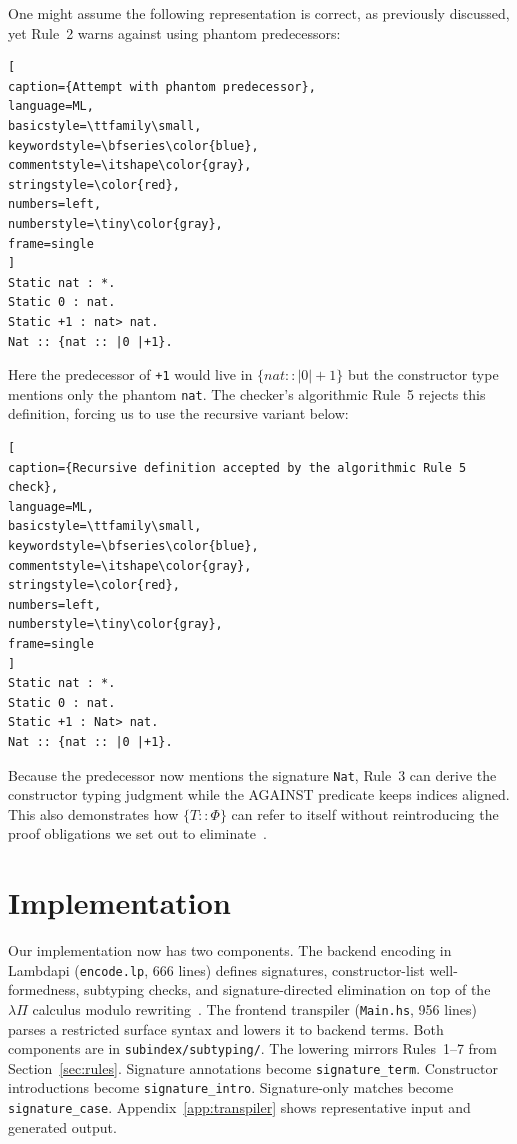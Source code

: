 \documentclass[a4paper, anonymous, UKenglish,cleveref, autoref, thm-restate]{lipics-v2021}
\begin{document}
One might assume the following representation is correct, as previously discussed, yet Rule~2 warns against using phantom predecessors:
	
\begin{lstlisting}[
caption={Attempt with phantom predecessor},
language=ML,
basicstyle=\ttfamily\small,
keywordstyle=\bfseries\color{blue},
commentstyle=\itshape\color{gray},
stringstyle=\color{red},
numbers=left,
numberstyle=\tiny\color{gray},
frame=single
]
Static nat : *.
Static 0 : nat.
Static +1 : nat> nat.
Nat :: {nat :: |0 |+1}.
\end{lstlisting}

Here the predecessor of \texttt{+1} would live in $\{nat :: |0 | +1\}$ but the constructor type mentions only the phantom \texttt{nat}. The checker's algorithmic Rule~5 rejects this definition, forcing us to use the recursive variant below:
	
\begin{lstlisting}[
caption={Recursive definition accepted by the algorithmic Rule 5 check},
language=ML,
basicstyle=\ttfamily\small,
keywordstyle=\bfseries\color{blue},
commentstyle=\itshape\color{gray},
stringstyle=\color{red},
numbers=left,
numberstyle=\tiny\color{gray},
frame=single
]
Static nat : *.
Static 0 : nat.
Static +1 : Nat> nat.
Nat :: {nat :: |0 |+1}.
\end{lstlisting}
Because the predecessor now mentions the signature \texttt{Nat}, Rule~3 can derive the constructor typing judgment while the \textsf{AGAINST} predicate keeps indices aligned. This also demonstrates how $\{T :: \Phi\}$ can refer to itself without reintroducing the proof obligations we set out to eliminate~\cite{martin2021intuitionistic}.

\section{Implementation}
\label{sec:implementation}
Our implementation now has two components. The backend encoding in Lambdapi (\texttt{encode.lp}, 666 lines) defines signatures, constructor-list well-formedness, subtyping checks, and signature-directed elimination on top of the $\lambda \Pi$ calculus modulo rewriting~\cite{Saillard}. The frontend transpiler (\texttt{Main.hs}, 956 lines) parses a restricted surface syntax and lowers it to backend terms. Both components are in \texttt{subindex/subtyping/}. The lowering mirrors Rules~1--7 from Section~\ref{sec:rules}. Signature annotations become \texttt{signature\_term}. Constructor introductions become \texttt{signature\_intro}. Signature-only matches become \texttt{signature\_case}. Appendix~\ref{app:transpiler} shows representative input and generated output.
\end{document}
